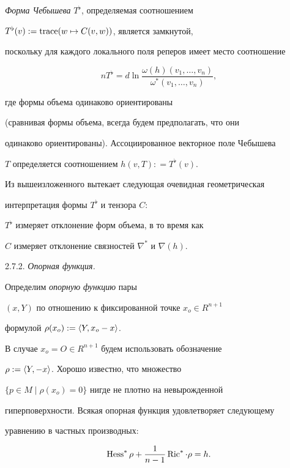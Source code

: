 {\it Форма Чебышева} $T^{\flat}$, определяемая соотношением


$T^{\flat}(v):= \operatorname{trace} (w \mapsto C(v,w))$, является замкнутой,


поскольку для каждого локального поля реперов имеет место соотношение


$$


n T^{\flat} = d \ln \frac {\omega(h) (v_1, \dotsc, v_n)}


{\omega^* (v_1, \dotsc, v_n)},


$$


где формы объема одинаково ориентированы


(сравнивая формы объема, всегда будем предполагать, что они


одинаково ориентированы). Ассоциированное векторное поле Чебышева


$T$ определяется соотношением $h(v,T): = T^{\flat}(v)$.





Из вышеизложенного вытекает следующая очевидная геометрическая


интерпретация формы $T^{\flat}$ и тензора $C$:


$T^{\flat}$ измеряет отклонение форм объема, в то время как


$C$ измеряет отклонение связностей $\nabla^*$ и $\nabla (h)$.


\smallskip





2.7.2. {\it Опорная функция.}


Определим {\it опорную функцию} пары


$(x,Y)$ по отношению к фиксированной точке $x_o \in R^{n+1}$


формулой $\rho(x_o) :=\langle Y, x_o - x\rangle$.


В случае $x_o = O \in R^{n+1}$ будем использовать обозначение


$\rho:=\langle Y,-x\rangle$. Хорошо известно, что множество


$\{ p \in M \mid \rho(x_o)=0\}$ нигде не плотно на невырожденной


гиперповерхности. Всякая опорная функция удовлетворяет следующему 


уравнению в частных производных:


$$


\Hess^* \rho + \frac{1}{n-1} \Ric^* \cdot \rho = h.


$$


